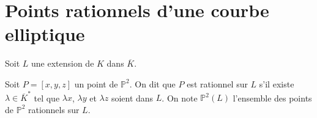 











\section{Points rationnels d'une courbe elliptique}

Soit $L$ une extension de $K$ dans $\overline{K}$.

\begin{definition}
    Soit $P=\left[ x,y,z \right] $ un point de $\mathbb{P}^2$. On dit que $P$ est rationnel sur $L$ s'il existe $\lambda \in \overline{K}^{*}$ tel que $\lambda x$, $\lambda y$ et $\lambda z$ soient dans $L$. On note $\mathbb{P}^2(L)$ l'ensemble des points de $\mathbb{P}^2$ rationnels sur $L$.

\end{definition}

